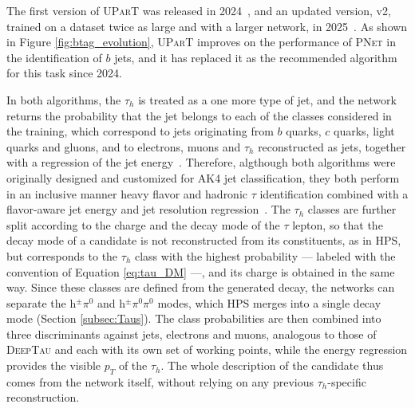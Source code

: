 The first version of \textsc{UParT} was released in 2024~\cite{CMS-UParT}, and an updated version, v2, trained on a dataset twice as large and with a larger network, in 2025~\cite{CMS-DP-2025-081}. As shown in Figure \ref{fig:btag_evolution}, \textsc{UParT} improves on the performance of \textsc{PNet} in the identification of $b$ jets, and it has replaced it as the recommended algorithm for this task since 2024.\medskip



\noindent In both algorithms, the $\tau_h$ is treated as a one more type of jet, and the network returns the probability that the jet belongs to each of the classes considered in the training, which correspond to jets originating from $b$ quarks, $c$ quarks, light quarks and gluons, and to electrons, muons and $\tau_h$ reconstructed as jets, together with a regression of the jet energy~\cite{CMS-UParT}. Therefore, algthough both algorithms were originally designed and customized for AK4 jet classification, they both perform in an inclusive manner heavy flavor and hadronic $\tau$ identification combined with a flavor-aware jet energy and jet resolution regression~\cite{CMS-UParT}. The $\tau_h$ classes are further split according to the charge and the decay mode of the $\tau$ lepton, so that the decay mode of a candidate is not reconstructed from its constituents, as in HPS, but corresponds to the $\tau_h$ class with the highest probability — labeled with the convention of Equation \ref{eq:tau_DM} —, and its charge is obtained in the same way. Since these classes are defined from the generated decay, the networks can separate the h$^{\pm}\pi^0$ and h$^{\pm}\pi^0\pi^0$ modes, which HPS merges into a single decay mode (Section \ref{subsec:Taus}). The class probabilities are then combined into three discriminants against jets, electrons and muons, analogous to those of \textsc{DeepTau} and each with its own set of working points, while the energy regression provides the visible $p_T$ of the $\tau_h$. The whole description of the candidate thus comes from the network itself, without relying on any previous $\tau_h$-specific reconstruction.

